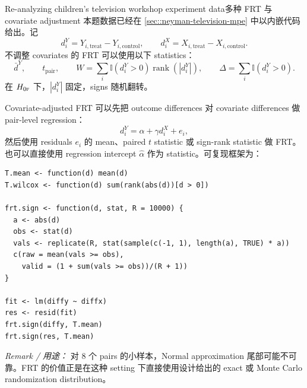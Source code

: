 \begin{exercisesolution}{Re-analyzing children's television workshop experiment data}{多种 FRT 与 covariate adjustment}
本题数据已经在 \cref{sec::neyman-television-mpe} 中以内嵌代码给出。记
\[
d^Y_i=Y_{i,\mathrm{treat}}-Y_{i,\mathrm{control}},\qquad
d^X_i=X_{i,\mathrm{treat}}-X_{i,\mathrm{control}}.
\]
不调整 covariates 的 FRT 可以使用以下 statistics：
\[
\bar d^Y,\qquad
t_{\mathrm{pair}},\qquad
W=\sum_i \mathbb{I}(d^Y_i>0)\operatorname{rank}(|d^Y_i|),\qquad
\Delta=\sum_i\mathbb{I}(d^Y_i>0).
\]
在 $H_{0\textsc{f}}$ 下，$|d^Y_i|$ 固定，signs 随机翻转。

Covariate-adjusted FRT 可以先把 outcome differences 对 covariate differences 做 pair-level regression：
\[
d^Y_i=\alpha+\gamma d^X_i+e_i,
\]
然后使用 residuals $e_i$ 的 mean、paired $t$ statistic 或 sign-rank statistic 做 FRT。也可以直接使用 regression intercept $\hat\alpha$ 作为 statistic。可复现框架为：
\begin{lstlisting}
T.mean <- function(d) mean(d)
T.wilcox <- function(d) sum(rank(abs(d))[d > 0])

frt.sign <- function(d, stat, R = 10000) {
  a <- abs(d)
  obs <- stat(d)
  vals <- replicate(R, stat(sample(c(-1, 1), length(a), TRUE) * a))
  c(raw = mean(vals >= obs),
    valid = (1 + sum(vals >= obs))/(R + 1))
}

fit <- lm(diffy ~ diffx)
res <- resid(fit)
frt.sign(diffy, T.mean)
frt.sign(res, T.mean)
\end{lstlisting}

\emph{Remark / 用途：} 对 8 个 pairs 的小样本，Normal approximation 尾部可能不可靠。FRT 的价值正是在这种 setting 下直接使用设计给出的 exact 或 Monte Carlo randomization distribution。
\end{exercisesolution}

